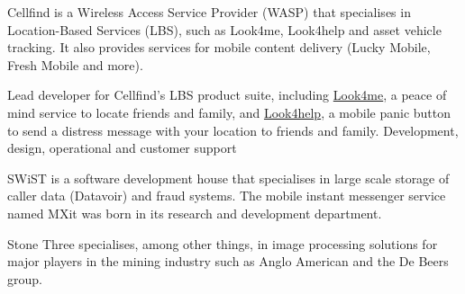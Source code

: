 \documentclass[10pt,a4paper,final]{columncv}
\begin{document}
\noindent Cellfind is a Wireless Access Service Provider (WASP) that specialises in Location-Based Services (LBS), such as Look4me, Look4help and asset vehicle tracking. It also provides services for mobile content delivery (Lucky Mobile, Fresh Mobile and more). 
\begin{cvenv}
         {Lead developer for Cellfind's LBS product suite, including  
         \href{http://www.look4me.co.za/}{Look4me}, a peace of mind 
         service to locate friends and family, and  
         \href{http://www.look4help.co.za/}{Look4help}, a mobile panic 
         button to send a distress message with your location to friends and family.}
         {Development, design, operational and customer support} %
\end{cvenv}


\noindent SWiST is a software development house that specialises in large scale storage of 
caller data (Datavoir) and fraud systems. The mobile instant messenger service named MXit was
born in its research and development department. 
\begin{cvenv}
\end{cvenv}

\noindent Stone Three specialises, among other things, in image processing solutions 
for major players in the mining industry such as Anglo American and the De Beers group. 
\begin{cvenv}
\end{cvenv}
\end{document}

